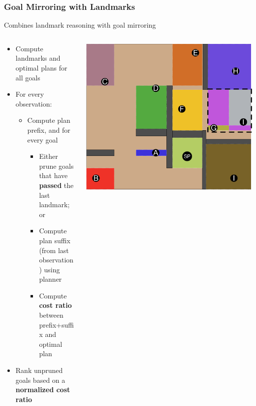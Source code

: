\documentclass{beamer}
\newcommand{\todo}[1]{ {\color{red} #1} }
\def\masterclass{1}
\begin{document}
	
	\begin{frame}[c]\frametitle{Goal Mirroring with Landmarks}
		Combines landmark reasoning with goal mirroring
		\begin{columns}
			\begin{column}{0.7\textwidth}
			\begin{itemize}
				\item Compute landmarks and optimal plans for all goals
				\item For every observation:
				\begin{itemize}
					\item Compute plan prefix, and for every goal
					\begin{itemize}
						\item Either prune goals that have \textbf{passed} the last landmark; or
						\item Compute plan suffix (from last observation) using planner
						\item Compute \textbf{cost ratio} between prefix+suffix and optimal plan
					\end{itemize}
				\end{itemize}
				\item Rank unpruned goals based on a \textbf{normalized cost ratio}
			\end{itemize}
			\end{column}
			\begin{column}{0.3\textwidth}
				\includegraphics[width=\textwidth]{fig/continuous-landmark-example.pdf}

\end{column}
\end{columns}
\end{frame}
\end{document}
